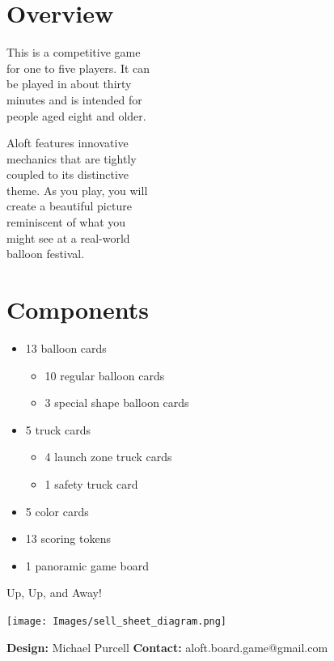 \documentclass[a5paper, DIV=18, 12pt]{scrartcl}
\begin{document}
\begin{multicols}{2}
\section*{Overview}
This is a competitive game\\for one to five players. It can\\be played in about thirty\\minutes and is intended for\\people aged eight and older.

\vspace{1.5ex}

Aloft features innovative\\mechanics that are tightly\\coupled to its distinctive\\theme. As you play, you will\\create a beautiful picture\\
reminiscent of what you \\ might see at a real-world\\balloon festival. \vfill\null\columnbreak
\section*{Components}
\begin{itemize}[nosep, leftmargin=*]
	\item 13 balloon cards
	\begin{itemize}[nosep, leftmargin=*]
	  \item 10 regular balloon cards
	  \item 3 special shape balloon cards
	\end{itemize}
	\vspace{1ex}
	\item 5 truck cards
	\begin{itemize}[nosep, leftmargin=*]
	  \item 4 launch zone truck cards
	  \item 1 safety truck card
	\end{itemize}
	\vspace{1ex}
	\item 5 color cards
	\vspace{1ex}
	\item 13 scoring tokens
	\vspace{1ex}
	\item 1 panoramic game board
\end{itemize}
\vspace{4.3ex}
{\setmainfont[Scale=1.125]{Fredoka-Bold}\LARGE \hfill Up, Up, and Away!}
\end{multicols}
\begin{center}
\vspace{-1.5ex}
\texttt{[image: Images/sell\_sheet\_diagram.png]}
\end{center}
\textbf{Design:} Michael Purcell \hfill \textbf{Contact:} aloft.board.game@gmail.com
\end{document}
